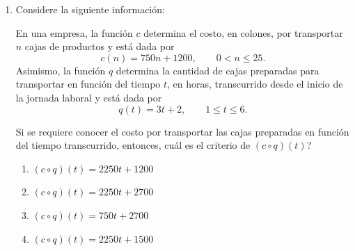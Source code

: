 \documentclass[12pt]{article}
\newcommand{\opcion}[2]{\item $#2$}
\begin{document}
\begin{enumerate}[label=\textbf{\arabic*.}, start=27, itemsep=2.5cm]

\Needspace{0.54\textheight}
\item
Considere la siguiente informaci\'on:

En una empresa, la funci\'on $c$ determina el costo, en colones, por transportar $n$ cajas de productos y est\'a dada por
\[
  c(n)=750n+1200, \qquad 0<n\leq 25.
\]
Asimismo, la funci\'on $q$ determina la cantidad de cajas preparadas para transportar en funci\'on del tiempo $t$, en horas, transcurrido desde el inicio de la jornada laboral y est\'a dada por
\[
  q(t)=3t+2, \qquad 1\leq t\leq 6.
\]

Si se requiere conocer el costo por transportar las cajas preparadas en funci\'on del tiempo transcurrido, entonces, \textquestiondown cu\'al es el criterio de $(c\circ q)(t)$?

\begin{enumerate}[label=\Alph*)]
  \opcion{A}{(c\circ q)(t)=2250t+1200}
  \opcion{B}{(c\circ q)(t)=2250t+2700}
  \opcion{C}{(c\circ q)(t)=750t+2700}
  \opcion{D}{(c\circ q)(t)=2250t+1500}
\end{enumerate}

\end{enumerate}
\end{document}
